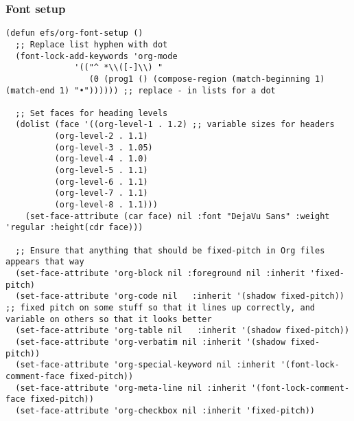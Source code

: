 \documentclass[11pt]{article}
\begin{document}
\subsubsection{Font setup}
\label{sec:org1a18b2f}
\begin{verbatim}
(defun efs/org-font-setup ()
  ;; Replace list hyphen with dot
  (font-lock-add-keywords 'org-mode
			  '(("^ *\\([-]\\) "
			     (0 (prog1 () (compose-region (match-beginning 1) (match-end 1) "•")))))) ;; replace - in lists for a dot

  ;; Set faces for heading levels
  (dolist (face '((org-level-1 . 1.2) ;; variable sizes for headers
		  (org-level-2 . 1.1)
		  (org-level-3 . 1.05)
		  (org-level-4 . 1.0)
		  (org-level-5 . 1.1)
		  (org-level-6 . 1.1)
		  (org-level-7 . 1.1)
		  (org-level-8 . 1.1)))
    (set-face-attribute (car face) nil :font "DejaVu Sans" :weight 'regular :height(cdr face)))

  ;; Ensure that anything that should be fixed-pitch in Org files appears that way
  (set-face-attribute 'org-block nil :foreground nil :inherit 'fixed-pitch)
  (set-face-attribute 'org-code nil   :inherit '(shadow fixed-pitch)) ;; fixed pitch on some stuff so that it lines up correctly, and variable on others so that it looks better
  (set-face-attribute 'org-table nil   :inherit '(shadow fixed-pitch))
  (set-face-attribute 'org-verbatim nil :inherit '(shadow fixed-pitch))
  (set-face-attribute 'org-special-keyword nil :inherit '(font-lock-comment-face fixed-pitch))
  (set-face-attribute 'org-meta-line nil :inherit '(font-lock-comment-face fixed-pitch))
  (set-face-attribute 'org-checkbox nil :inherit 'fixed-pitch))
\end{verbatim}
\end{document}
